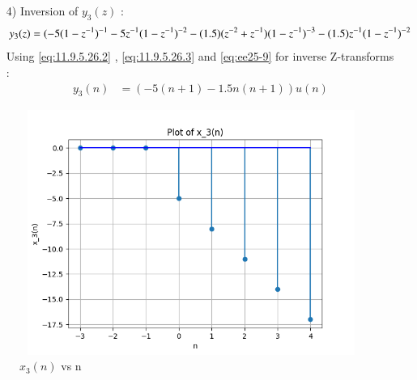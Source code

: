 \documentclass[journal,12pt,onecolumn]{IEEEtran}
\theoremstyle{remark}
\begin{document}
\begin{enumerate}
    \item[4)]
Inversion of $y_3(z)$ :
\begin{align}
    y_3(z) = \notag(-5(1-z^{-1})^{-1} - 5z^{-1}(1-z^{-1})^{-2} - (1.5)(z^{-2} + z^{-1})(1-z^{-1})^{-3} - (1.5)z^{-1}(1-z^{-1})^{-2}  
\end{align}
Using \eqref{eq:11.9.5.26.2} , \eqref{eq:11.9.5.26.3} and \eqref{eq:ee25-9} for inverse Z-transforms :
\begin{align}
 y_3(n) &= (-5(n+1) - 1.5n(n+1))u(n)   
\end{align}
\end{enumerate}


\begin{figure}[!ht]   
\centering
\graphicspath{ {figs/} }
\includegraphics[width=12cm, height=8cm]{graph_3}
\caption{$x_3(n)$ vs n }
\label{graph:ee25-g4}
\end{figure}
 
\end{document}
